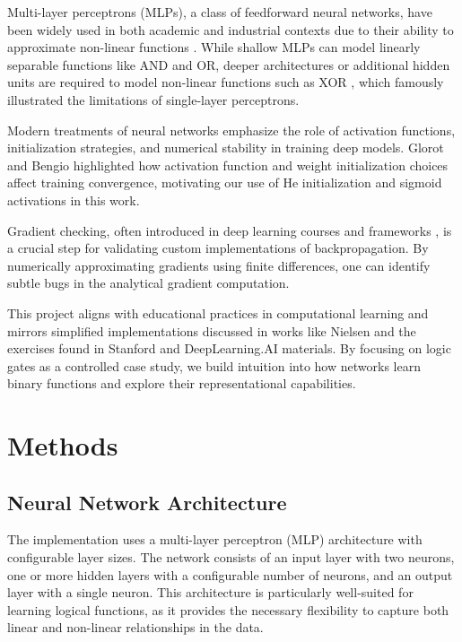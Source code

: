 \documentclass[11pt,a4paper]{article}
\begin{document}
Multi-layer perceptrons (MLPs), a class of feedforward neural networks, have been widely used in both academic and industrial contexts due to their ability to approximate non-linear functions \cite{HORNIK1989359}. While shallow MLPs can model linearly separable functions like AND and OR, deeper architectures or additional hidden units are required to model non-linear functions such as XOR \cite{minsky1969perceptrons}, which famously illustrated the limitations of single-layer perceptrons.

Modern treatments of neural networks emphasize the role of activation functions, initialization strategies, and numerical stability in training deep models. Glorot and Bengio \cite{pmlr-v9-glorot10a} highlighted how activation function and weight initialization choices affect training convergence, motivating our use of He initialization and sigmoid activations in this work.

Gradient checking, often introduced in deep learning courses and frameworks \cite{ng2017deep}, is a crucial step for validating custom implementations of backpropagation. By numerically approximating gradients using finite differences, one can identify subtle bugs in the analytical gradient computation.

This project aligns with educational practices in computational learning and mirrors simplified implementations discussed in works like Nielsen \cite{nielsen2015neural} and the exercises found in Stanford and DeepLearning.AI materials. By focusing on logic gates as a controlled case study, we build intuition into how networks learn binary functions and explore their representational capabilities.

\section{Methods}
\label{sec:methods}
\subsection{Neural Network Architecture}
The implementation uses a multi-layer perceptron (MLP) architecture with configurable layer sizes. The network consists of an input layer with two neurons, one or more hidden layers with a configurable number of neurons, and an output layer with a single neuron. This architecture is particularly well-suited for learning logical functions, as it provides the necessary flexibility to capture both linear and non-linear relationships in the data.
\end{document}
